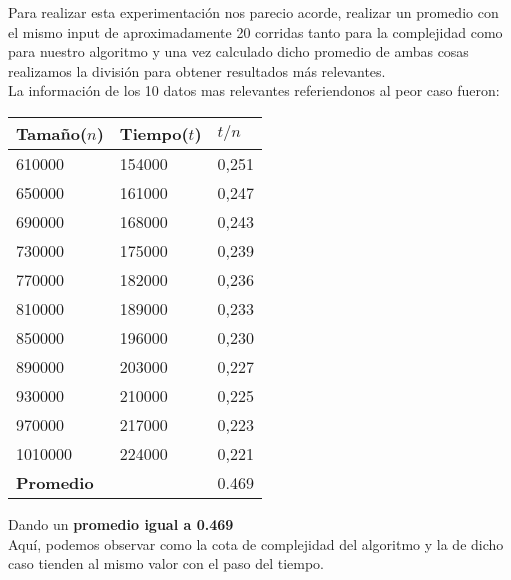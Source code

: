 \vspace*{0.3cm} \vspace*{0.3cm}
  \begin{center}
  \end{center}
  \vspace*{0.3cm}
  
  Para realizar esta experimentaci\'on nos parecio acorde, realizar un promedio con el mismo input de aproximadamente 20 corridas
tanto para la complejidad como para nuestro algoritmo y una vez calculado dicho promedio de ambas cosas realizamos la divisi\'on para
obtener resultados m\'as relevantes.\\ 


La informaci\'on de los 10 datos mas relevantes referiendonos al peor caso fueron:

\begin{table}[H]

    \begin{tabular}{ | l | l |l |}
    \hline
	Tamaño($n$) & Tiempo($t$) & \textbf{$t /n$}  \\ \hline
610000 & 154000 & 0,251 \\ \hline
650000 & 161000 & 0,247 \\ \hline
690000 & 168000 & 0,243 \\ \hline
730000 & 175000 & 0,239 \\ \hline
770000 & 182000 & 0,236 \\ \hline
810000 & 189000 & 0,233 \\ \hline
850000 & 196000 & 0,230 \\ \hline
890000 & 203000 & 0,227 \\ \hline
930000 & 210000 & 0,225 \\ \hline
970000 & 217000 & 0,223 \\ \hline
1010000 & 224000 & 0,221 \\ \hline
    \textbf{Promedio} & & 0.469 \\ \hline

    \end{tabular}
\end{table}

Dando un \textbf{promedio igual a 0.469} \\

Aqu\'i, podemos observar como la cota de complejidad del algoritmo y la de dicho caso tienden al mismo valor con el paso del tiempo.\\